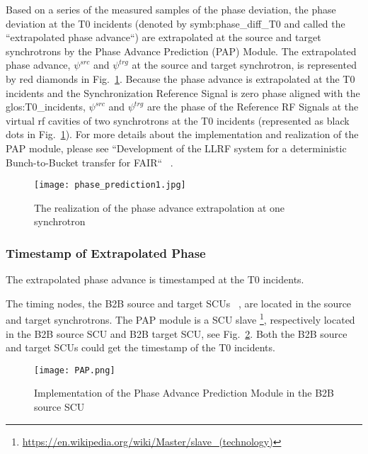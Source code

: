 Based on a series of the measured samples of the phase deviation, the phase deviation at the T0 incidents (denoted by \gls{symb:phase_diff_T0} and called the ``extrapolated phase advance``) are extrapolated at the source and target synchrotrons by the Phase Advance Prediction (\gls{PAP}) Module. The extrapolated phase advance, $\psi^\mathit{src}$ and $\psi^\mathit{trg}$ at the source and target synchrotron, is represented by red diamonds in Fig.~\ref{phase_prediction1}. Because the phase advance is extrapolated at the T0 incidents and the Synchronization Reference Signal is zero phase aligned with the \gls{glos:T0_incidents}, $\psi^\mathit{src}$ and $\psi^\mathit{trg}$ are the phase of the Reference RF Signals at the virtual rf cavities of two synchrotrons at the T0 incidents (represented as black dots in Fig.~\ref{phase_prediction1}). For more details about the implementation and realization of the PAP module, please see ``Development of the LLRF system for a deterministic Bunch-to-Bucket transfer for FAIR`` ~\cite{ferrand_development_????}.   
\begin{figure}[!htb]
   \centering   
   \texttt{[image: phase\_prediction1.jpg]}
   \caption{The realization of the phase advance extrapolation at one synchrotron}
   \label{phase_prediction1}
\end{figure}
\subsubsection{Timestamp of Extrapolated Phase}
The extrapolated phase advance is timestamped at the T0 incidents.

The timing nodes, the B2B source and target SCUs ~\cite{beck_new_2012, thieme_scu_2013}, are located in the source and target synchrotrons. The PAP module is a SCU slave \footnote{\url{https://en.wikipedia.org/wiki/Master/slave_(technology)}}, respectively located in the B2B source SCU and B2B target SCU, see Fig.~\ref{PAP}. Both the B2B source and target SCUs could get the timestamp of the T0 incidents. 
 \begin{figure}[!htb]
   \centering   
   \texttt{[image: PAP.png]}
   \caption{Implementation of the Phase Advance Prediction Module in the B2B source SCU}
   \label{PAP}
\end{figure}


